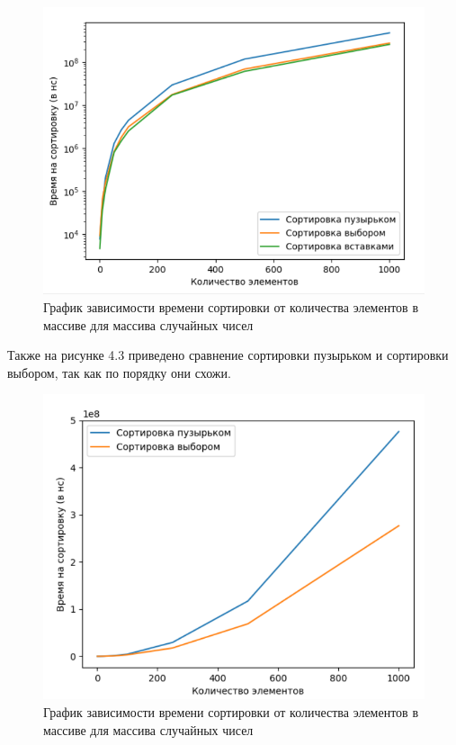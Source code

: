 \FloatBarrier
\begin{figure}[h]
	\begin{center}
		\includegraphics[]{inc/random1.png}
	\end{center}
	\caption{График зависимости времени сортировки от количества элементов в массиве для массива случайных чисел}
\end{figure}
\FloatBarrier

Также на рисунке 4.3 приведено сравнение сортировки пузырьком и сортировки выбором, так как 
по порядку они схожи.

\FloatBarrier
\begin{figure}[h]
	\begin{center}
		\includegraphics[]{inc/random2.png}
	\end{center}
	\caption{График зависимости времени сортировки от количества элементов в массиве для массива случайных чисел}
\end{figure}
\FloatBarrier

